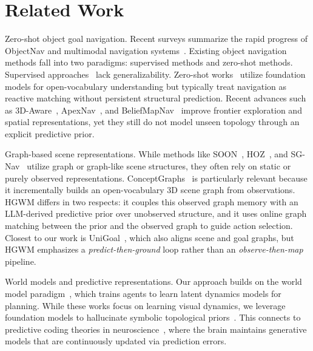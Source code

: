 \documentclass{article}
\begin{document}
\section{Related Work}

Zero-shot object goal navigation. Recent surveys summarize the rapid progress of ObjectNav and multimodal navigation systems~\citep{sun2024survey,ieong2025multimodal}. Existing object navigation methods fall into two paradigms: supervised methods and zero-shot methods. Supervised approaches~\citep{ramrakhya2022habitat,yadav2023ovrl} lack generalizability. Zero-shot works~\citep{majumdar2022zson,gadre2023cows,zhou2023esc,kuang2024openfmnav,chen2023not} utilize foundation models for open-vocabulary understanding but typically treat navigation as reactive matching without persistent structural prediction. Recent advances such as 3D-Aware~\citep{zhang20233d}, ApexNav~\citep{zhang2025apexnav}, and BeliefMapNav~\citep{zhou2025beliefmapnav} improve frontier exploration and spatial representations, yet they still do not model unseen topology through an explicit predictive prior.

Graph-based scene representations.
While methods like SOON~\citep{zhu2021soon}, HOZ~\citep{zhang2021hierarchical}, and SG-Nav~\citep{yin2024sg} utilize graph or graph-like scene structures, they often rely on static or purely observed representations. ConceptGraphs~\citep{gu2024conceptgraphs} is particularly relevant because it incrementally builds an open-vocabulary 3D scene graph from observations. HGWM differs in two respects: it couples this observed graph memory with an LLM-derived predictive prior over unobserved structure, and it uses online graph matching between the prior and the observed graph to guide action selection. Closest to our work is UniGoal~\citep{yin2025unigoal}, which also aligns scene and goal graphs, but HGWM emphasizes a \textit{predict-then-ground} loop rather than an \textit{observe-then-map} pipeline.

World models and predictive representations.
Our approach builds on the world model paradigm~\citep{logue2018world,hafner2023mastering,koh2021pathdreamer}, which trains agents to learn latent dynamics models for planning. While these works focus on learning visual dynamics, we leverage foundation models to hallucinate symbolic topological priors~\citep{bar2025navigation}. This connects to predictive coding theories in neuroscience~\citep{friston2010free,clark2013whatever}, where the brain maintains generative models that are continuously updated via prediction errors.
\end{document}
